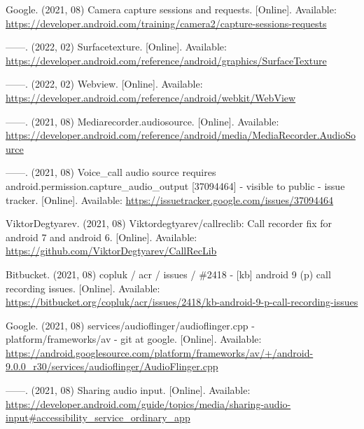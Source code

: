 \documentclass[sigconf,balance=false]{acmart}
\begin{document}
\begin{thebibliography}{100}
\BIBentryALTinterwordspacing
Google. (2021, 08) Camera capture sessions and requests. [Online]. Available:
  \url{https://developer.android.com/training/camera2/capture-sessions-requests}
\BIBentrySTDinterwordspacing

\BIBentryALTinterwordspacing
------. (2022, 02) Surfacetexture. [Online]. Available:
  \url{https://developer.android.com/reference/android/graphics/SurfaceTexture}
\BIBentrySTDinterwordspacing

\BIBentryALTinterwordspacing
------. (2022, 02) Webview. [Online]. Available:
  \url{https://developer.android.com/reference/android/webkit/WebView}
\BIBentrySTDinterwordspacing

\BIBentryALTinterwordspacing
------. (2021, 08) Mediarecorder.audiosource. [Online]. Available:
  \url{https://developer.android.com/reference/android/media/MediaRecorder.AudioSource}
\BIBentrySTDinterwordspacing

\BIBentryALTinterwordspacing
------. (2021, 08) Voice\_call audio source requires
  android.permission.capture\_audio\_output [37094464] - visible to public -
  issue tracker. [Online]. Available:
  \url{https://issuetracker.google.com/issues/37094464}
\BIBentrySTDinterwordspacing

\BIBentryALTinterwordspacing
ViktorDegtyarev. (2021, 08) Viktordegtyarev/callreclib: Call recorder fix for
  android 7 and android 6. [Online]. Available:
  \url{https://github.com/ViktorDegtyarev/CallRecLib}
\BIBentrySTDinterwordspacing

\BIBentryALTinterwordspacing
Bitbucket. (2021, 08) copluk / acr / issues / \#2418 - [kb] android 9 (p) call
  recording issues. [Online]. Available:
  \url{https://bitbucket.org/copluk/acr/issues/2418/kb-android-9-p-call-recording-issues}
\BIBentrySTDinterwordspacing

\BIBentryALTinterwordspacing
Google. (2021, 08) services/audioflinger/audioflinger.cpp -
  platform/frameworks/av - git at google. [Online]. Available:
  \url{https://android.googlesource.com/platform/frameworks/av/+/android-9.0.0_r30/services/audioflinger/AudioFlinger.cpp}
\BIBentrySTDinterwordspacing

\BIBentryALTinterwordspacing
------. (2021, 08) Sharing audio input. [Online]. Available:
  \url{https://developer.android.com/guide/topics/media/sharing-audio-input#accessibility_service_ordinary_app}
\BIBentrySTDinterwordspacing


\end{thebibliography}
\end{document}
